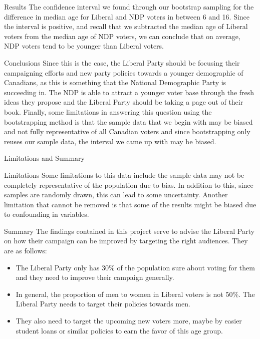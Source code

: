 \documentclass[
  9pt,
  ignorenonframetext,
]{beamer}
\providecommand{\tightlist}{%
  \setlength{\itemsep}{0pt}\setlength{\parskip}{0pt}}
\begin{document}
\begin{frame}
\begin{block}{Results}
\protect\hypertarget{results-2}{}
The confidence interval we found through our bootstrap sampling for the
difference in median age for Liberal and NDP voters in between 6 and 16.
Since the interval is positive, and recall that we subtracted the median
age of Liberal voters from the median age of NDP voters, we can conclude
that on average, NDP voters tend to be younger than Liberal voters.
\end{block}

\begin{block}{Conclusions}
\protect\hypertarget{conclusions}{}
Since this is the case, the Liberal Party should be focusing their
campaigning efforts and new party policies towards a younger demographic
of Canadians, as this is something that the National Demographic Party
is succeeding in. The NDP is able to attract a younger voter base
through the fresh ideas they propose and the Liberal Party should be
taking a page out of their book. Finally, some limitations in answering
this question using the bootstrapping method is that the sample data
that we begin with may be biased and not fully representative of all
Canadian voters and since bootstrapping only reuses our sample data, the
interval we came up with may be biased.
\end{block}
\end{frame}

\begin{frame}{Limitations and Summary}
\protect\hypertarget{limitations-and-summary}{}
\begin{block}{Limitations}
\protect\hypertarget{limitations}{}
Some limitations to this data include the sample data may not be
completely representative of the population due to bias. In addition to
this, since samples are randomly drawn, this can lead to some
uncertainty. Another limitation that cannot be removed is that some of
the results might be biased due to confounding in variables.
\end{block}

\begin{block}{Summary}
\protect\hypertarget{summary}{}
The findings contained in this project serve to advise the Liberal Party
on how their campaign can be improved by targeting the right audiences.
They are as follows:

\begin{itemize}
\tightlist
\item
  The Liberal Party only has 30\% of the population sure about voting
  for them and they need to improve their campaign generally.
\item
  In general, the proportion of men to women in Liberal voters is not
  50\%. The Liberal Party needs to target their policies towards men.
\item
  They also need to target the upcoming new voters more, maybe by easier
  student loans or similar policies to earn the favor of this age group.
\end{itemize}
\end{block}
\end{frame}
\end{document}

